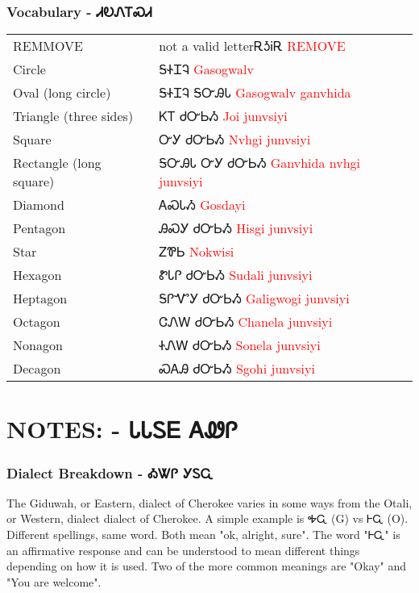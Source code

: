 \subsection{Vocabulary - ᏗᎧᏁᎢᏍᏗ 
}
\begin{tabular}{p{3cm} p{11cm}}
REMMOVE & not a valid letterᎡᎼᎥᎡ 
 \newline \textcolor{red}{REMOVE}\\
Circle & ᎦᏐᏆᎸ 
 \newline \textcolor{red}{Gasogwalv}\\
Oval (long circle) & ᎦᏐᏆᎸ ᎦᏅᎯᏓ 
 \newline \textcolor{red}{Gasogwalv ganvhida}\\
Triangle (three sides) & ᏦᎢ ᏧᏅᏏᏱ 
 \newline \textcolor{red}{Joi junvsiyi}\\
Square & ᏅᎩ ᏧᏅᏏᏱ 
 \newline \textcolor{red}{Nvhgi junvsiyi}\\
Rectangle (long square) & ᎦᏅᎯᏓ ᏅᎩ ᏧᏅᏏᏱ 
 \newline \textcolor{red}{Ganvhida nvhgi junvsiyi}\\
Diamond & ᎪᏍᏓᏱ 
 \newline \textcolor{red}{Gosdayi}\\
Pentagon & ᎯᏍᎩ ᏧᏅᏏᏱ 
 \newline \textcolor{red}{Hisgi junvsiyi}\\
Star & ᏃᏈᏏ 
 \newline \textcolor{red}{Nokwisi}\\
Hexagon & ᏑᏓᎵ ᏧᏅᏏᏱ 
 \newline \textcolor{red}{Sudali junvsiyi}\\
Heptagon & ᎦᎵᏉᎩ ᏧᏅᏏᏱ 
 \newline \textcolor{red}{Galigwogi junvsiyi}\\
Octagon & ᏣᏁᎳ ᏧᏅᏏᏱ 
 \newline \textcolor{red}{Chanela junvsiyi}\\
Nonagon & ᏐᏁᎳ ᏧᏅᏏᏱ 
 \newline \textcolor{red}{Sonela junvsiyi}\\
Decagon & ᏍᎪᎯ ᏧᏅᏏᏱ 
 \newline \textcolor{red}{Sgohi junvsiyi}\\
\end{tabular}

\chapter{NOTES: - ᏓᏓᏚᎬ ᎪᏪᎵ 
}
\subsection{Dialect Breakdown - ᎣᏔᎵ  ᎩᏚᏩ}
The Giduwah, or Eastern, dialect of Cherokee varies in some ways from the Otali, or Western, dialect dialect of Cherokee.  A simple example is ᎭᏩ (G) vs ᎰᏩ (O).  Different spellings, same word.  Both mean "ok, alright, sure".  The word "ᎰᏩ" is an affirmative response and can be understood to mean different things depending on how it is used. Two of the more common meanings are "Okay" and "You are welcome".\cite{joynerlesson4}

